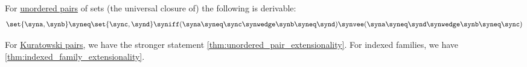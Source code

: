 \begin{proposition}\label{thm:unordered_pair_extensionality}
  For \hyperref[def:unordered_pair]{unordered pairs} of sets (the universal closure of) the following is derivable:
  \begin{equation*}
    \set{ \syna, \synb } \syneq \set{ \sync, \synd } \syniff (\syna \syneq \sync \synwedge \synb \syneq \synd) \synvee (\syna \syneq \synd \synwedge \synb \syneq \sync)
  \end{equation*}
\end{proposition}
\begin{comments}
  \item For \hyperref[def:kuratowski_pair]{Kuratowski pairs}, we have the stronger statement \cref{thm:unordered_pair_extensionality}. For indexed families, we have \cref{thm:indexed_family_extensionality}.
\end{comments}
